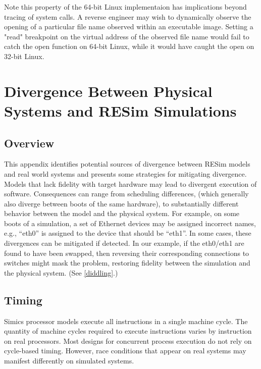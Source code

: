 \documentclass[titlepage]{article}
\begin{document}
Note this property of the 64-bit Linux implementaion has implications beyond tracing of system calls.  A reverse
engineer may wish to dynamically observe the opening of a particular file name observed within an executable image.
Setting a "read" breakpoint on the virtual address of the observed file name would fail to catch the open function
on 64-bit Linux, while it would have caught the open on 32-bit Linux.

\section{Divergence Between Physical Systems and RESim Simulations}

\subsection{Overview}
This appendix identifies potential sources of divergence between RESim models and
real world systems and presents some strategies for mitigating divergence.  
Models that lack fidelity with target hardware may lead to divergent execution of software.
Consequences can range from scheduling differences, (which generally also diverge between
boots of the same hardware), to substantially different behavior between the model and
the physical system.
For example, on some boots of a simulation, a set of Ethernet devices may be assigned incorrect names, e.g., ``eth0''
is assigned to the device that should be ``eth1''.  In some cases, these
divergences can be 
mitigated if detected.  In our example, if the eth0/eth1 are found to have been
swapped, then reversing their corresponding connections to switches might mask the problem,
restoring fidelity between the simulation and the physical system.  (See \ref{diddling}.)

\subsection{Timing}
Simics processor models execute all instructions in a single machine cycle.  The quantity
of machine cycles required to execute instructions varies by instruction on real processors.
Most designs for concurrent process execution do not rely on cycle-based timing.  However,
race conditions that appear on real systems may manifest differently on simulated systems.
\end{document}
